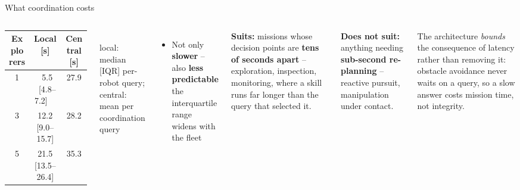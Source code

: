 \documentclass[aspectratio=169,10pt]{beamer}
\newcommand{\callout}[2][upmblue]{%
  \begin{beamercolorbox}[wd=\linewidth,sep=6pt,rounded=false]{}%
    \color{#1}\small #2%
  \end{beamercolorbox}%
}
\begin{document}
\begin{frame}{What coordination costs}
  \begin{columns}[T]
  \vspace{-2pt}
  \footnotesize
  \begin{tabular}{@{}ccc@{}}
    \toprule
    \textbf{\color{upmnavy}Explorers} &
    \textbf{\color{upmnavy}Local [s]} &
    \textbf{\color{upmnavy}Central [s]} \\
    \midrule
    1 & \ \ 5.5\ \ [4.8--7.2]\ \  & 27.9 \\
    3 & 12.2 [9.0--15.7]  & 28.2 \\
    5 & 21.5 [13.5--26.4] & 35.3 \\
    \bottomrule
  \end{tabular}
  \vspace{4pt}\\
  {\scriptsize\color{upmgray} local: median [IQR] per-robot query;
  central: mean per coordination query}
  \vspace{6pt}
  \begin{itemize}\small
    \item Not only \textbf{slower} -- also \textbf{less predictable}\\[-1pt]
      {\footnotesize\color{upmgray} the interquartile range widens with
      the fleet}
  \end{itemize}
  \vspace{2pt}
  \callout[upmnavy]{\footnotesize \textbf{Suits:} missions whose decision
  points are \textbf{tens of seconds apart} -- exploration, inspection,
  monitoring, where a skill runs far longer than the query that selected it.}
  \vspace{4pt}
  \callout[upmred]{\footnotesize \textbf{Does not suit:} anything needing
  \textbf{sub-second re-planning} -- reactive pursuit, manipulation under
  contact.}
  \vspace{4pt}
  {\footnotesize\color{upmgray} The architecture \emph{bounds} the
  consequence of latency rather than removing it: obstacle avoidance never
  waits on a query, so a slow answer costs mission time, not integrity.}
  \end{columns}
\end{frame}
\end{document}
